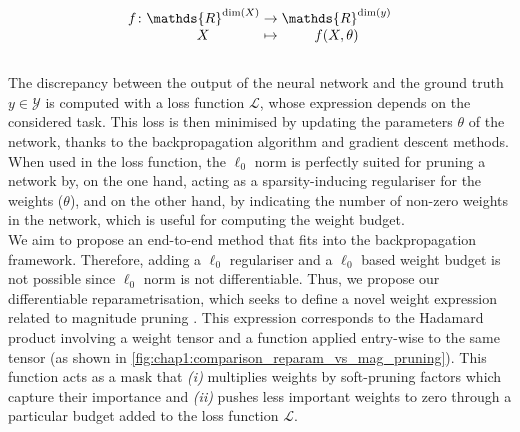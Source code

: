 
\begin{equation}
  \begingroup
  \setlength\arraycolsep{0pt}
  f \colon\begin{array}[t]{c >{{}}c<{{}} c}
    \mathds{R}^{\dim (X)} & \to     & \mathds{R}^{\dim (y)} \\
    X                     & \mapsto & f(X, \theta)
  \end{array}
  \endgroup
\end{equation}\\

The discrepancy between the output of the neural network and the ground truth $y
\in \mathcal{Y}$ is computed with a loss function $\mathcal{L}$, whose
expression depends on the considered task. This loss is then minimised by
updating the parameters $\theta$ of the network, thanks to the backpropagation
algorithm \cite{rumelhart1985learning,rumelhart1986learning} and gradient
descent methods.\\

When used in the loss function, the $\ell_0$ norm is perfectly suited for
pruning a network by, on the one hand, acting as a sparsity-inducing regulariser
for the weights ($\theta$), and on the other hand, by indicating the number of
non-zero weights in the network, which is useful for computing the weight
budget. \\

We aim to propose an end-to-end method that fits into the backpropagation
framework. Therefore, adding a $\ell_0$ regulariser and a $\ell_0$ based weight budget
is not possible since $\ell_0$ norm is not differentiable. Thus, we propose our
differentiable reparametrisation, which seeks to define a novel weight
expression related to magnitude pruning
\cite{DBLP:conf/nips/CunDS89,DBLP:conf/nips/HanPTD15}. This expression
corresponds to the Hadamard product involving a weight tensor and a function
applied entry-wise to the same tensor (as shown in
\cref{fig:chap1:comparison_reparam_vs_mag_pruning}). This function acts as a
mask that \emph{(i)} multiplies weights by soft-pruning factors which capture their
importance and \emph{(ii)} pushes less important weights to zero through a particular
budget added to the loss function $\mathcal{L}$. \\

